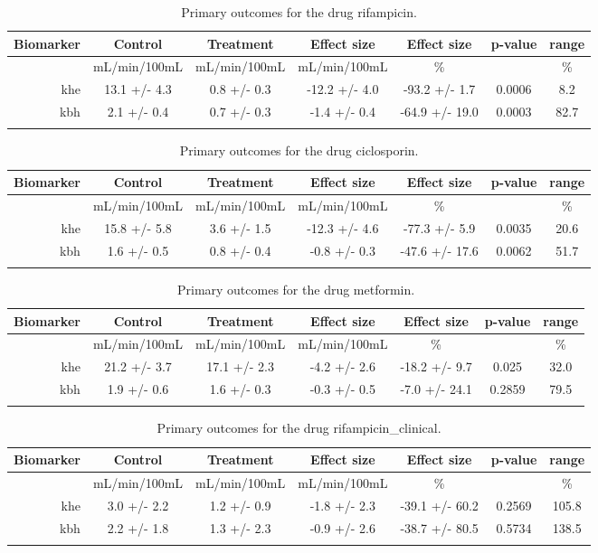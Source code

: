 \documentclass{epflreport}%
\begin{document}
%
\begin{longtable}{rcccccc}%
\hline%
Biomarker&Control&Treatment&Effect size&Effect size&p{-}value&range\\%
\hline%
&mL/min/100mL&mL/min/100mL&mL/min/100mL&\%&&\%\\%
khe&13.1 +/{-} 4.3&0.8 +/{-} 0.3&{-}12.2 +/{-} 4.0&{-}93.2 +/{-} 1.7&0.0006&8.2\\%
kbh&2.1 +/{-} 0.4&0.7 +/{-} 0.3&{-}1.4 +/{-} 0.4&{-}64.9 +/{-} 19.0&0.0003&82.7\\%
\hline%
\caption{Primary outcomes for the drug rifampicin.} \\%
\end{longtable}%
\begin{longtable}{rcccccc}%
\hline%
Biomarker&Control&Treatment&Effect size&Effect size&p{-}value&range\\%
\hline%
&mL/min/100mL&mL/min/100mL&mL/min/100mL&\%&&\%\\%
khe&15.8 +/{-} 5.8&3.6 +/{-} 1.5&{-}12.3 +/{-} 4.6&{-}77.3 +/{-} 5.9&0.0035&20.6\\%
kbh&1.6 +/{-} 0.5&0.8 +/{-} 0.4&{-}0.8 +/{-} 0.3&{-}47.6 +/{-} 17.6&0.0062&51.7\\%
\hline%
\caption{Primary outcomes for the drug ciclosporin.} \\%
\end{longtable}%
\begin{longtable}{rcccccc}%
\hline%
Biomarker&Control&Treatment&Effect size&Effect size&p{-}value&range\\%
\hline%
&mL/min/100mL&mL/min/100mL&mL/min/100mL&\%&&\%\\%
khe&21.2 +/{-} 3.7&17.1 +/{-} 2.3&{-}4.2 +/{-} 2.6&{-}18.2 +/{-} 9.7&0.025&32.0\\%
kbh&1.9 +/{-} 0.6&1.6 +/{-} 0.3&{-}0.3 +/{-} 0.5&{-}7.0 +/{-} 24.1&0.2859&79.5\\%
\hline%
\caption{Primary outcomes for the drug metformin.} \\%
\end{longtable}%
\begin{longtable}{rcccccc}%
\hline%
Biomarker&Control&Treatment&Effect size&Effect size&p{-}value&range\\%
\hline%
&mL/min/100mL&mL/min/100mL&mL/min/100mL&\%&&\%\\%
khe&3.0 +/{-} 2.2&1.2 +/{-} 0.9&{-}1.8 +/{-} 2.3&{-}39.1 +/{-} 60.2&0.2569&105.8\\%
kbh&2.2 +/{-} 1.8&1.3 +/{-} 2.3&{-}0.9 +/{-} 2.6&{-}38.7 +/{-} 80.5&0.5734&138.5\\%
\hline%
\caption{Primary outcomes for the drug rifampicin\_clinical.} \\%
\end{longtable}%
\clearpage%
\end{document}
